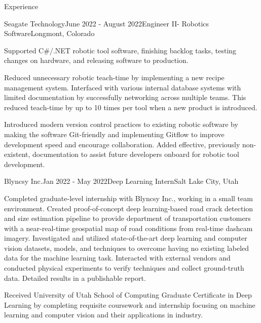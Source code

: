 \documentclass{resume}
\begin{document}
  \begin{rSection}{Experience}

    \begin{rSubsection}{Seagate Technology}{June 2022 - August 2022}{Engineer II- Robotics Software}{Longmont, Colorado}
    \item Supported C\#/.NET robotic tool software, finishing backlog tasks, testing changes on hardware, and releasing software to production. 
    \item Reduced unnecessary robotic teach-time by implementing a new recipe management system. Interfaced with various internal database systems with limited documentation by successfully networking across multiple teams. This reduced teach-time by up to 10 times per tool when a new product is introduced.
    \item Introduced modern version control practices to existing robotic software by making the software Git-friendly and implementing Gitflow to improve development speed and encourage collaboration. Added effective, previously non-existent, documentation to assist future developers onboard for robotic tool development.
    \end{rSubsection}

    \begin{rSubsection}{Blyncsy Inc.}{Jan 2022 - May 2022}{Deep Learning Intern}{Salt Lake City, Utah}
    \item Completed graduate-level internship with Blyncsy Inc., working in a small team environment. Created proof-of-concept deep learning-based road crack detection and size estimation pipeline to provide department of transportation customers with a near-real-time geospatial map of road conditions from real-time dashcam imagery. Investigated and utilized state-of-the-art deep learning and computer vision datasets, models, and techniques to overcome having no existing labeled data for the machine learning task. Interacted with external vendors and conducted physical experiments to verify techniques and collect ground-truth data. Detailed results in a publishable report.
    \item Received University of Utah School of Computing Graduate Certificate in Deep Learning by completing requisite coursework and internship focusing on machine learning and computer vision and their applications in industry.
    \end{rSubsection}
  

\end{rSection}
\end{document}
